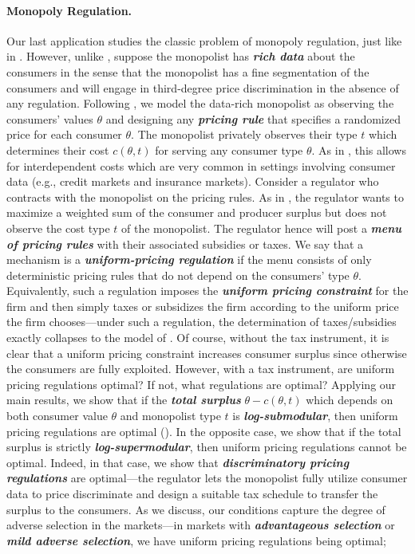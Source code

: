\documentclass[12pt,letterpaper]{article}
\newenvironment{original}{\color{black}\noindent}{}
\theoremstyle{plain}
\theoremstyle{definition}
\theoremstyle{remark}
\renewcommand{\1}{\mathds{1}}
\theoremstyle{definition}
\begin{document}
\paragraph{Monopoly Regulation.}\hspace{-2mm}\begin{original}Our last application studies the classic problem of monopoly regulation, just like in \citet{Baron1982RegulatingCosts}. However, unlike \citet{Baron1982RegulatingCosts}, suppose the monopolist has \textit{\textbf{rich data}} about the consumers in the sense that the monopolist has a fine segmentation of the consumers and will engage in third-degree price discrimination in the absence of any regulation. Following \citet{strack2025non}, we model the data-rich monopolist as observing the consumers' values $\theta$ and designing any \textit{\textbf{pricing rule}} that specifies a randomized price for each consumer $\theta$. The monopolist privately observes their type $t$ which determines their cost $c(\theta, t)$ for serving any consumer type $\theta$. As in \citet{strack2025non}, this allows for interdependent costs which are very common in settings involving consumer data (e.g., credit markets and insurance markets). Consider a regulator who contracts with the monopolist on the pricing rules. As in \citet{Baron1982RegulatingCosts}, the regulator wants to maximize a weighted sum of the consumer and producer surplus but does not observe the cost type $t$ of the monopolist. The regulator hence will post a \textit{\textbf{menu of pricing rules}} with their associated subsidies or taxes. We say that a mechanism is a \textit{\textbf{uniform-pricing regulation}} if the menu consists of only deterministic pricing rules that do not depend on the consumers' type $\theta$. Equivalently, such a regulation imposes the \textit{\textbf{uniform pricing constraint}} for the firm and then simply taxes or subsidizes the firm according to the uniform price the firm chooses---under such a regulation, the determination of taxes/subsidies exactly collapses to the model of \citet{Baron1982RegulatingCosts}. Of course, without the tax instrument, it is clear that a uniform pricing constraint increases consumer surplus since otherwise the consumers are fully exploited. However, with a tax instrument, are uniform pricing regulations optimal? If not, what regulations are optimal? Applying our main results, we show that if the \textit{\textbf{total surplus}} $\theta - c(\theta, t)$ which depends on both consumer value $\theta$ and monopolist type $t$ is \textit{\textbf{log-submodular}}, then uniform pricing regulations are optimal (). In the opposite case, we show that if the total surplus is strictly \textit{\textbf{log-supermodular}}, then uniform pricing regulations cannot be optimal. Indeed, in that case, we show that \textit{\textbf{discriminatory pricing regulations}} are optimal---the regulator lets the monopolist fully utilize consumer data to price discriminate and design a suitable tax schedule to transfer the surplus to the consumers. As we discuss, our conditions capture the degree of adverse selection in the markets---in markets with \textit{\textbf{advantageous selection}} or \textit{\textbf{mild adverse selection}}, we have uniform pricing regulations being optimal; 
\end{document}
